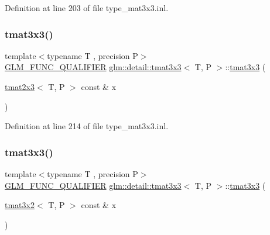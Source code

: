 Definition at line 203 of file type\+\_\+mat3x3.\+inl.

\mbox{\label{structglm_1_1detail_1_1tmat3x3_a41ebff3cc8fb20c2e47684333186d1db}} 
\subsubsection{\texorpdfstring{tmat3x3()}{tmat3x3()}\hspace{0.1cm}{\footnotesize\ttfamily [13/22]}}
{\footnotesize\ttfamily template$<$typename T , precision P$>$ \\
\hyperlink{setup_8hpp_a33fdea6f91c5f834105f7415e2a64407}{G\+L\+M\+\_\+\+F\+U\+N\+C\+\_\+\+Q\+U\+A\+L\+I\+F\+I\+ER} \hyperlink{structglm_1_1detail_1_1tmat3x3}{glm\+::detail\+::tmat3x3}$<$ T, P $>$\+::\hyperlink{structglm_1_1detail_1_1tmat3x3}{tmat3x3} (\begin{DoxyParamCaption}\item[{\hyperlink{structglm_1_1detail_1_1tmat2x3}{tmat2x3}$<$ T, P $>$ const \&}]{x }\end{DoxyParamCaption})\hspace{0.3cm}{\ttfamily [explicit]}}



Definition at line 214 of file type\+\_\+mat3x3.\+inl.

\mbox{\label{structglm_1_1detail_1_1tmat3x3_ad518c170d44ccf4b1d2d92559a2769b6}} 
\subsubsection{\texorpdfstring{tmat3x3()}{tmat3x3()}\hspace{0.1cm}{\footnotesize\ttfamily [14/22]}}
{\footnotesize\ttfamily template$<$typename T , precision P$>$ \\
\hyperlink{setup_8hpp_a33fdea6f91c5f834105f7415e2a64407}{G\+L\+M\+\_\+\+F\+U\+N\+C\+\_\+\+Q\+U\+A\+L\+I\+F\+I\+ER} \hyperlink{structglm_1_1detail_1_1tmat3x3}{glm\+::detail\+::tmat3x3}$<$ T, P $>$\+::\hyperlink{structglm_1_1detail_1_1tmat3x3}{tmat3x3} (\begin{DoxyParamCaption}\item[{\hyperlink{structglm_1_1detail_1_1tmat3x2}{tmat3x2}$<$ T, P $>$ const \&}]{x }\end{DoxyParamCaption})\hspace{0.3cm}{\ttfamily [explicit]}}



